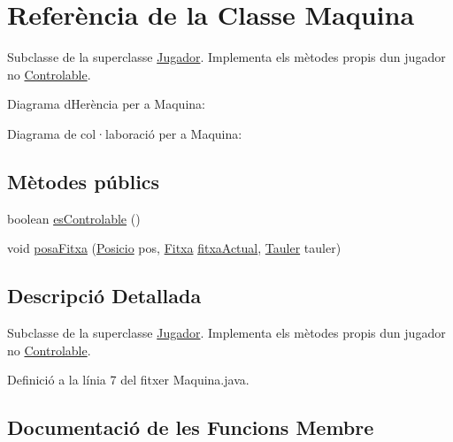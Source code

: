 \hypertarget{class_maquina}{}\section{Referència de la Classe Maquina}
\label{class_maquina}


Subclasse de la superclasse \mbox{\hyperlink{class_jugador}{Jugador}}. Implementa els mètodes propis d\textquotesingle{}un jugador no \mbox{\hyperlink{class_controlable}{Controlable}}.  




Diagrama d\textquotesingle{}Herència per a Maquina\+:


Diagrama de col·laboració per a Maquina\+:
\subsection*{Mètodes públics}
\begin{DoxyCompactItemize}
\item 
boolean \mbox{\hyperlink{class_maquina_a92c55fa390f4cf00bfc55060525a5433}{es\+Controlable}} ()
\item 
void \mbox{\hyperlink{class_maquina_a2e26c9f440fdf09879e0c8434dd02e35}{posa\+Fitxa}} (\mbox{\hyperlink{class_posicio}{Posicio}} pos, \mbox{\hyperlink{class_fitxa}{Fitxa}} \mbox{\hyperlink{class_jugador_a221c891bd7f14049abe513c2705ac5bc}{fitxa\+Actual}}, \mbox{\hyperlink{class_tauler}{Tauler}} tauler)
\end{DoxyCompactItemize}


\subsection{Descripció Detallada}
Subclasse de la superclasse \mbox{\hyperlink{class_jugador}{Jugador}}. Implementa els mètodes propis d\textquotesingle{}un jugador no \mbox{\hyperlink{class_controlable}{Controlable}}. 

Definició a la línia 7 del fitxer Maquina.\+java.



\subsection{Documentació de les Funcions Membre}
\mbox{\label{class_maquina_a92c55fa390f4cf00bfc55060525a5433}} 
